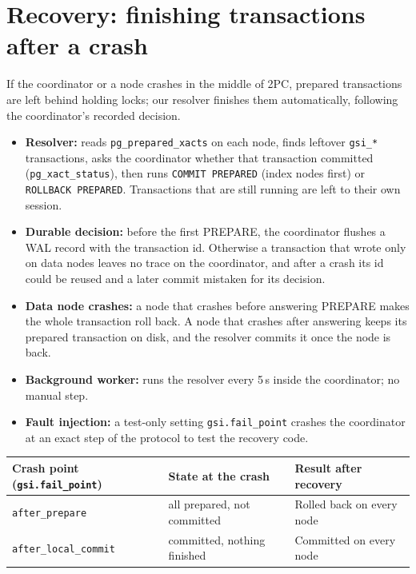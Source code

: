 \documentclass[11pt,a4paper]{article}
\begin{document}
\section{Recovery: finishing transactions after a crash}
If the coordinator or a node crashes in the middle of 2PC, prepared transactions are left behind holding
locks; our resolver finishes them automatically, following the coordinator's recorded decision.
\begin{itemize}
  \item \textbf{Resolver:} reads \texttt{pg\_prepared\_xacts} on each node, finds leftover
        \texttt{gsi\_*} transactions, asks the coordinator whether that transaction committed
        (\texttt{pg\_xact\_status}), then runs \texttt{COMMIT PREPARED} (index nodes first) or
        \texttt{ROLLBACK PREPARED}. Transactions that are still running are left to their own session.
  \item \textbf{Durable decision:} before the first PREPARE, the coordinator flushes a WAL record with
        the transaction id. Otherwise a transaction that wrote only on data nodes leaves no trace on the
        coordinator, and after a crash its id could be reused and a later commit mistaken for its decision.
  \item \textbf{Data node crashes:} a node that crashes before answering PREPARE makes the whole
        transaction roll back. A node that crashes after answering keeps its prepared transaction on
        disk, and the resolver commits it once the node is back.
  \item \textbf{Background worker:} runs the resolver every 5\,s inside the coordinator; no manual step.
  \item \textbf{Fault injection:} a test-only setting \texttt{gsi.fail\_point} crashes the coordinator at
        an exact step of the protocol to test the recovery code.
\end{itemize}

\begin{center}
\begin{tabular}{lll}
\toprule
Crash point (\texttt{gsi.fail\_point}) & State at the crash & Result after recovery \\
\midrule
\texttt{after\_prepare}      & all prepared, not committed & Rolled back on every node \\
\texttt{after\_local\_commit} & committed, nothing finished & Committed on every node \\
\bottomrule
\end{tabular}
\end{center}
\end{document}
